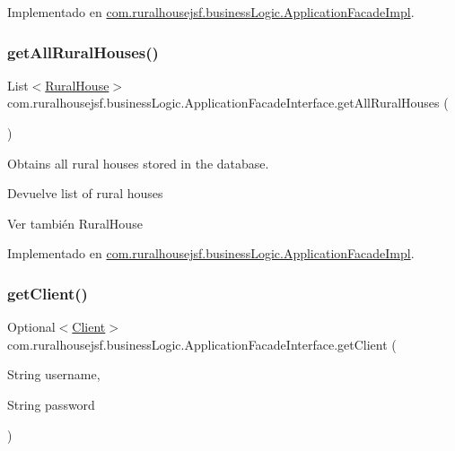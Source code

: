 Implementado en \mbox{\hyperlink{a00132_aab772c94cd469793cc01ec1418e29763}{com.\+ruralhousejsf.\+business\+Logic.\+Application\+Facade\+Impl}}.

\mbox{\label{a00136_aba85657d1479d51b7bf1bd17d66d0513}} 
\subsubsection{\texorpdfstring{getAllRuralHouses()}{getAllRuralHouses()}}
{\footnotesize\ttfamily List$<$\mbox{\hyperlink{a00188}{Rural\+House}}$>$ com.\+ruralhousejsf.\+business\+Logic.\+Application\+Facade\+Interface.\+get\+All\+Rural\+Houses (\begin{DoxyParamCaption}{ }\end{DoxyParamCaption})}



Obtains all rural houses stored in the database. 

\begin{DoxyReturn}{Devuelve}
list of rural houses
\end{DoxyReturn}
\begin{DoxySeeAlso}{Ver también}
Rural\+House 
\end{DoxySeeAlso}


Implementado en \mbox{\hyperlink{a00132_a22bb7d4b98f51470315a81cd0d6f2290}{com.\+ruralhousejsf.\+business\+Logic.\+Application\+Facade\+Impl}}.

\mbox{\label{a00136_af9901ddc9cbe77aaa08085c3c19167c6}} 
\subsubsection{\texorpdfstring{getClient()}{getClient()}}
{\footnotesize\ttfamily Optional$<$\mbox{\hyperlink{a00164}{Client}}$>$ com.\+ruralhousejsf.\+business\+Logic.\+Application\+Facade\+Interface.\+get\+Client (\begin{DoxyParamCaption}\item[{String}]{username,  }\item[{String}]{password }\end{DoxyParamCaption})}



